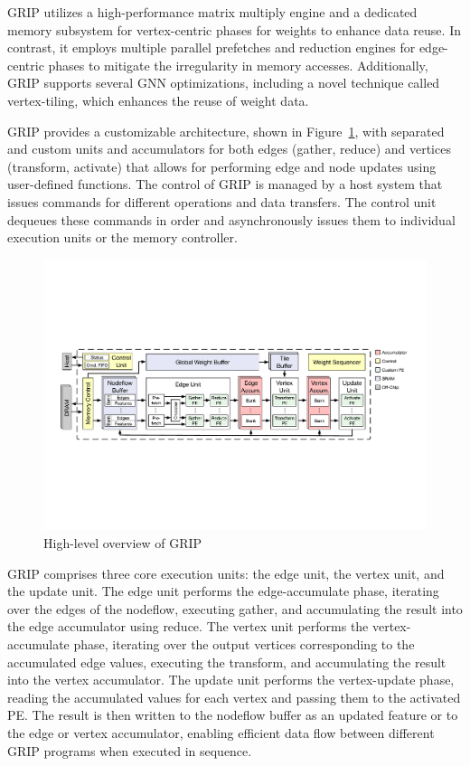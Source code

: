GRIP utilizes a high-performance matrix multiply engine and a dedicated memory subsystem for vertex-centric phases for weights to enhance data reuse.
In contrast, it employs multiple parallel prefetches and reduction engines for edge-centric phases to mitigate the irregularity in memory accesses.
Additionally, GRIP supports several GNN optimizations, including a novel technique called vertex-tiling, which enhances the reuse of weight data.

GRIP provides a customizable architecture, shown in Figure~\ref{fig:grip_architecture}, with separated and custom units and accumulators for both edges (gather, reduce) and vertices (transform, activate) that allows for performing edge and node updates using user-defined functions.
The control of GRIP is managed by a host system that issues commands for different operations and data transfers.
The control unit dequeues these commands in order and asynchronously issues them to individual execution units or the memory controller.

\begin{figure}[t]
    \centering
    \includegraphics[height=0.26\textwidth]{Images/GRIP_architecture}
    \caption{High-level overview of GRIP~\cite{DBLP:journals/corr/abs-2007-13828}}
    \label{fig:grip_architecture}
\end{figure}

GRIP comprises three core execution units: the edge unit, the vertex unit, and the update unit.
The edge unit performs the edge-accumulate phase, iterating over the edges of the nodeflow, executing gather, and accumulating the result into the edge accumulator using reduce.
The vertex unit performs the vertex-accumulate phase, iterating over the output vertices corresponding to the accumulated edge values, executing the transform, and accumulating the result into the vertex accumulator.
The update unit performs the vertex-update phase, reading the accumulated values for each vertex and passing them to the activated PE.
The result is then written to the nodeflow buffer as an updated feature or to the edge or vertex accumulator, enabling efficient data flow between different GRIP programs when executed in sequence.

